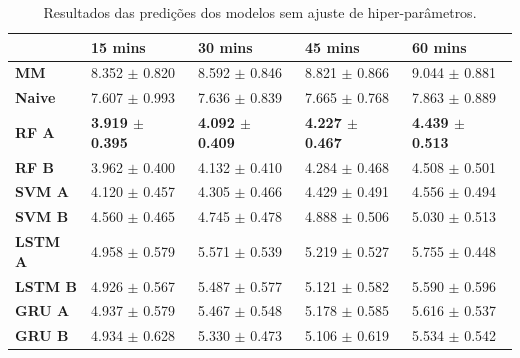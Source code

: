 \begin{table}[H]
    \begin{tabular*}{\linewidth}{@{\extracolsep{\fill}}lllll}
    \toprule
     & 
    \multicolumn{1}{l}{\textbf{15 mins}} & 
    \multicolumn{1}{l}{\textbf{30 mins}} &
    \multicolumn{1}{l}{\textbf{45 mins}} &
    \multicolumn{1}{l}{\textbf{60 mins}} \\
\midrule
\textbf{MM} & 8.352 $\pm$ 0.820 & 8.592 $\pm$ 0.846 & 8.821 $\pm$ 0.866 & 9.044 $\pm$ 0.881
\\

\midrule
\textbf{Naive} & 7.607 $\pm$ 0.993 & 7.636 $\pm$ 0.839 & 7.665 $\pm$ 0.768 & 7.863 $\pm$ 0.889
\\

\midrule
\textbf{RF A} & \textbf{3.919 $\pm$ 0.395} & \textbf{4.092 $\pm$ 0.409} & \textbf{4.227 $\pm$ 0.467} & \textbf{4.439 $\pm$ 0.513}
\\

\midrule
\textbf{RF B} & 3.962 $\pm$ 0.400 & 4.132 $\pm$ 0.410 & 4.284 $\pm$ 0.468 & 4.508 $\pm$ 0.501
\\

\midrule
\textbf{SVM A} & 4.120 $\pm$ 0.457 & 4.305 $\pm$ 0.466 & 4.429 $\pm$ 0.491 & 4.556 $\pm$ 0.494
\\

\midrule
\textbf{SVM B} & 4.560 $\pm$ 0.465 & 4.745 $\pm$ 0.478 & 4.888 $\pm$ 0.506 & 5.030 $\pm$ 0.513
\\

\midrule
\textbf{LSTM A} & 4.958 $\pm$ 0.579 & 5.571 $\pm$ 0.539 & 5.219 $\pm$ 0.527 & 5.755 $\pm$ 0.448
\\

\midrule
\textbf{LSTM B} & 4.926 $\pm$ 0.567 & 5.487 $\pm$ 0.577 & 5.121 $\pm$ 0.582 & 5.590 $\pm$ 0.596
\\

\midrule
\textbf{GRU A} & 4.937 $\pm$ 0.579 & 5.467 $\pm$ 0.548 & 5.178 $\pm$ 0.585 & 5.616 $\pm$ 0.537
\\

\midrule
\textbf{GRU B} & 4.934 $\pm$ 0.628 & 5.330 $\pm$ 0.473 & 5.106 $\pm$ 0.619 & 5.534 $\pm$ 0.542
\\
    \bottomrule
    \end{tabular*}
    \label{table:curto_prazo_no_tuning}
    \caption{Resultados das predições dos modelos sem ajuste de hiper-parâmetros.}
\end{table}


